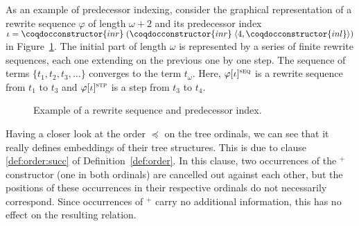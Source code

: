 As an example of predecessor indexing, consider the graphical
representation of a rewrite sequence $\varphi$ of length $\omega + 2$
and its predecessor index $\iota = \coqdocconstructor{inr} \;
(\coqdocconstructor{inr} \; \langle 4,
\coqdocconstructor{inl}\rangle)$ in Figure~\ref{fig:pred}. The initial
part of length $\omega$ is represented by a series of finite rewrite
sequences, each one extending on the previous one by one step. The
sequence of terms $\{ t_1,t_2, t_3, \ldots \}$ converges to the term
$t_\omega$. Here, $\varphi[\iota]^\textsc{seq}$ is a rewrite sequence
from $t_1$ to $t_3$ and $\varphi[\iota]^\textsc{stp}$ is a step from
$t_3$ to $t_4$.

\begin{figure}
\begin{center}
\begin{tikzpicture}[scale=0.85]

\end{tikzpicture}
\end{center}
\caption{Example of a rewrite sequence and predecessor
  index.}\label{fig:pred}
\end{figure}

Having a closer look at the order $\preceq$ on the tree ordinals, we can
see that it really defines embeddings of their tree structures. This is due to
clause {\sc \ref{def:order:succ}} of Definition~\ref{def:order}. In
this clause, two occurrences of the $^+$ constructor (one in both
ordinals) are cancelled out against each other, but the positions of
these occurrences in their respective ordinals do not necessarily
correspond. Since occurrences of $^+$ carry no additional information,
this has no effect on the resulting relation.

